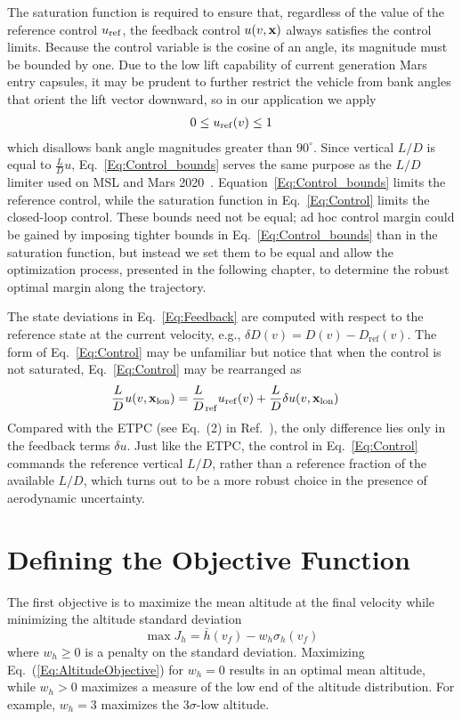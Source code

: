 The saturation function is required to ensure that, regardless of the value of the reference control $ u_{\mathrm{ref}} $, the feedback control $u(v,\mathbf{x})$ always satisfies the control limits. Because the control variable is the cosine of an angle, its magnitude must be bounded by one. Due to the low lift capability of current generation Mars entry capsules, it may be prudent to further restrict the vehicle from bank angles that orient the lift vector downward, so in our application we apply
\begin{align}
	0 \le u_{\mathrm{ref}}(v) \le 1 \label{Eq:Control_bounds}
\end{align}
which disallows bank angle magnitudes greater than $90^\circ$. Since vertical $L/D$ is equal to $\frac{L}{D}u$, Eq.~\eqref{Eq:Control_bounds} serves the same purpose as the $L/D$ limiter used on MSL and Mars 2020~\cite{MSL_EDL2}. Equation~\eqref{Eq:Control_bounds} limits the reference control, while the saturation function in Eq.~\eqref{Eq:Control} limits the closed-loop control. These bounds need not be equal; ad hoc control margin could be gained by imposing tighter bounds in Eq.~\eqref{Eq:Control_bounds} than in the saturation function, but instead we set them to be equal and allow the optimization process, presented in the following chapter, to determine the robust optimal margin along the trajectory.

The state deviations in Eq.~\eqref{Eq:Feedback} are computed with respect to the reference state at the current velocity, e.g., $\delta D(v) = D(v) - D_{\mathrm{ref}}(v)$.
The form of Eq.~\eqref{Eq:Control} may be unfamiliar but notice that when the control is not saturated, Eq.~\eqref{Eq:Control} may be rearranged as
\begin{align}
	\frac{L}{D}u(v,\mathbf{x}_{\mathrm{lon}}) &= \frac{L}{D}_{\mathrm{ref}}u_{\mathrm{ref}}(v) + \frac{L}{D}\delta u(v,\mathbf{x}_{\mathrm{lon}}) \label{Eq:Control_rearranged}
\end{align}
Compared with the ETPC (see Eq.~(2) in Ref.~\cite{MSL_EDL2}), the only difference lies only in the feedback terms $\delta u$. Just like the ETPC, the control in Eq.~\eqref{Eq:Control} commands the reference vertical $ L/D $, rather than a reference fraction of the available $ L/D $, which turns out to be a more robust choice in the presence of aerodynamic uncertainty.

\section{Defining the Objective Function}
The first objective is to maximize the mean altitude at the final velocity while minimizing the altitude standard deviation
\begin{equation}
	\max J_h = \bar{h}(v_f) - w_h\sigma_h(v_f) \label{Eq:AltitudeObjective}
\end{equation}
where $w_h\ge0$ is a penalty on the standard deviation. Maximizing Eq.~(\ref{Eq:AltitudeObjective}) for $w_h=0$ results in an optimal mean altitude, while $w_h>0$ maximizes a measure of the low end of the altitude distribution. For example, $w_h=3$ maximizes the 3$\sigma$-low altitude. 

